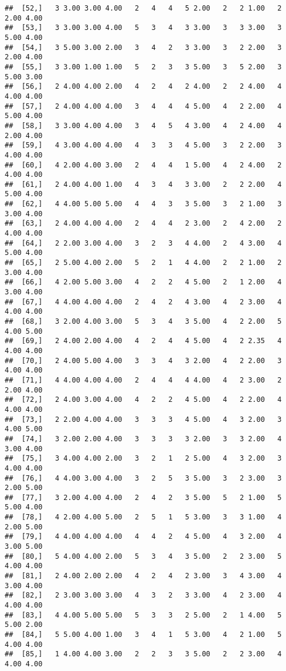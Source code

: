 \documentclass[]{article}
\begin{document}
\begin{verbatim}
##  [52,]   3 3.00 3.00 4.00   2   4   4   5 2.00   2   2 1.00   2 2.00 4.00
##  [53,]   3 3.00 3.00 4.00   5   3   4   3 3.00   3   3 3.00   3 5.00 4.00
##  [54,]   3 5.00 3.00 2.00   3   4   2   3 3.00   3   2 2.00   3 2.00 4.00
##  [55,]   3 3.00 1.00 1.00   5   2   3   3 5.00   3   5 2.00   3 5.00 3.00
##  [56,]   2 4.00 4.00 2.00   4   2   4   2 4.00   2   2 4.00   4 4.00 4.00
##  [57,]   2 4.00 4.00 4.00   3   4   4   4 5.00   4   2 2.00   4 5.00 4.00
##  [58,]   3 3.00 4.00 4.00   3   4   5   4 3.00   4   2 4.00   4 2.00 4.00
##  [59,]   4 3.00 4.00 4.00   4   3   3   4 5.00   3   2 2.00   3 4.00 4.00
##  [60,]   4 2.00 4.00 3.00   2   4   4   1 5.00   4   2 4.00   2 4.00 4.00
##  [61,]   2 4.00 4.00 1.00   4   3   4   3 3.00   2   2 2.00   4 5.00 4.00
##  [62,]   4 4.00 5.00 5.00   4   4   3   3 5.00   3   2 1.00   3 3.00 4.00
##  [63,]   2 4.00 4.00 4.00   2   4   4   2 3.00   2   4 2.00   2 4.00 4.00
##  [64,]   2 2.00 3.00 4.00   3   2   3   4 4.00   2   4 3.00   4 5.00 4.00
##  [65,]   2 5.00 4.00 2.00   5   2   1   4 4.00   2   2 1.00   2 3.00 4.00
##  [66,]   4 2.00 5.00 3.00   4   2   2   4 5.00   2   1 2.00   4 3.00 4.00
##  [67,]   4 4.00 4.00 4.00   2   4   2   4 3.00   4   2 3.00   4 4.00 4.00
##  [68,]   3 2.00 4.00 3.00   5   3   4   3 5.00   4   2 2.00   5 4.00 5.00
##  [69,]   2 4.00 2.00 4.00   4   2   4   4 5.00   4   2 2.35   4 4.00 4.00
##  [70,]   2 4.00 5.00 4.00   3   3   4   3 2.00   4   2 2.00   3 4.00 4.00
##  [71,]   4 4.00 4.00 4.00   2   4   4   4 4.00   4   2 3.00   2 2.00 4.00
##  [72,]   2 4.00 3.00 4.00   4   2   2   4 5.00   4   2 2.00   4 4.00 4.00
##  [73,]   2 2.00 4.00 4.00   3   3   3   4 5.00   4   3 2.00   3 4.00 5.00
##  [74,]   3 2.00 2.00 4.00   3   3   3   3 2.00   3   3 2.00   4 3.00 4.00
##  [75,]   3 4.00 4.00 2.00   3   2   1   2 5.00   4   3 2.00   3 4.00 4.00
##  [76,]   4 4.00 3.00 4.00   3   2   5   3 5.00   3   2 3.00   3 2.00 5.00
##  [77,]   3 2.00 4.00 4.00   2   4   2   3 5.00   5   2 1.00   5 5.00 4.00
##  [78,]   4 2.00 4.00 5.00   2   5   1   5 3.00   3   3 1.00   4 2.00 5.00
##  [79,]   4 4.00 4.00 4.00   4   4   2   4 5.00   4   3 2.00   4 3.00 5.00
##  [80,]   5 4.00 4.00 2.00   5   3   4   3 5.00   2   2 3.00   5 4.00 4.00
##  [81,]   2 4.00 2.00 2.00   4   2   4   2 3.00   3   4 3.00   4 3.00 4.00
##  [82,]   2 3.00 3.00 3.00   4   3   2   3 3.00   4   2 3.00   4 4.00 4.00
##  [83,]   4 4.00 5.00 5.00   5   3   3   2 5.00   2   1 4.00   5 5.00 2.00
##  [84,]   5 5.00 4.00 1.00   3   4   1   5 3.00   4   2 1.00   5 4.00 4.00
##  [85,]   1 4.00 4.00 3.00   2   2   3   3 5.00   2   2 3.00   4 4.00 4.00

\end{verbatim}
\end{document}
